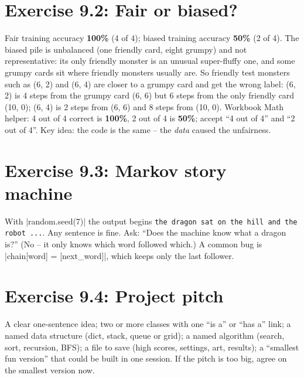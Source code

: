 \section{Exercise 9.2: Fair or biased?}
\begin{answer}[Answers]
Fair training accuracy \textbf{100\%} (4 of 4); biased training accuracy \textbf{50\%} (2 of 4). The biased pile is unbalanced (one friendly card, eight grumpy) and not representative: its only friendly monster is an unusual super-fluffy one, and some grumpy cards sit where friendly monsters usually are. So friendly test monsters such as (6, 2) and (6, 4) are closer to a grumpy card and get the wrong label: (6, 2) is 4 steps from the grumpy card (6, 6) but 6 steps from the only friendly card (10, 0); (6, 4) is 2 steps from (6, 6) and 8 steps from (10, 0). Workbook Math helper: 4 out of 4 correct is \textbf{100\%}, 2 out of 4 is \textbf{50\%}; accept \enquote{4 out of 4} and \enquote{2 out of 4}. Key idea: the code is the same -- the \emph{data} caused the unfairness.
\end{answer}

\section{Exercise 9.3: Markov story machine}
\begin{answer}
With \py|random.seed(7)| the output begins \texttt{the dragon sat on the hill and the robot ...}. Any sentence is fine. Ask: \enquote{Does the machine know what a dragon is?} (No -- it only knows which word followed which.) A common bug is \py|chain[word] = [next_word]|, which keeps only the last follower.
\end{answer}

\section{Exercise 9.4: Project pitch}
\begin{answer}
A clear one-sentence idea; two or more classes with one \enquote{is a} or \enquote{has a} link; a named data structure (dict, stack, queue or grid); a named algorithm (search, sort, recursion, BFS); a file to save (high scores, settings, art, results); a \enquote{smallest fun version} that could be built in one session. If the pitch is too big, agree on the smallest version now.
\end{answer}

